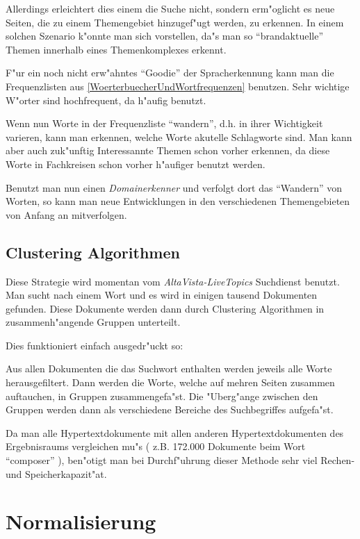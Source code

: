 Allerdings erleichtert dies einem die Suche nicht, sondern erm"oglicht es neue Seiten, die zu einem Themengebiet hinzugef"ugt werden, zu erkennen. In einem solchen Szenario k"onnte man sich vorstellen, da"s man so "`brandaktuelle"' Themen innerhalb eines Themenkomplexes erkennt.

F"ur ein noch nicht erw"ahntes "`Goodie"' der Spracherkennung kann man die Frequenzlisten aus \ref{WoerterbuecherUndWortfrequenzen} benutzen. Sehr wichtige W"orter sind hochfrequent, da h"aufig benutzt.

Wenn nun Worte in der Frequenzliste "`wandern"', d.h. in ihrer Wichtigkeit varieren, kann man erkennen, welche Worte akutelle Schlagworte sind. Man kann aber auch zuk"unftig Interessannte Themen schon vorher erkennen, da diese Worte in Fachkreisen schon vorher h"aufiger benutzt werden.

Benutzt man nun einen {\em Domainerkenner} und verfolgt dort das "`Wandern"' von Worten, so kann man neue Entwicklungen in den verschiedenen Themengebieten von Anfang an mitverfolgen.



\subsection{Clustering Algorithmen}

Diese Strategie wird momentan vom {\em AltaVista-LiveTopics} Suchdienst benutzt. Man sucht nach einem Wort und es wird in einigen tausend Dokumenten gefunden. Diese Dokumente werden dann durch Clustering Algorithmen in zusammenh"angende Gruppen unterteilt.

Dies funktioniert einfach ausgedr"uckt so:

Aus allen Dokumenten die das Suchwort enthalten werden jeweils alle Worte herausgefiltert. Dann werden die Worte, welche auf mehren Seiten zusammen auftauchen, in Gruppen zusammengefa"st. Die "Uberg"ange zwischen den Gruppen werden dann als verschiedene Bereiche des Suchbegriffes aufgefa"st.

Da man alle Hypertextdokumente mit allen anderen Hypertextdokumenten des Ergebnisraums vergleichen mu"s ( z.B. 172.000 Dokumente beim Wort "`composer"' ), ben"otigt man bei Durchf"uhrung dieser Methode sehr viel Rechen- und Speicherkapazit"at.


\section{Normalisierung}

